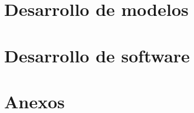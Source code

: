 \documentclass{article}
\begin{document}
\clearpage\hbox{}\thispagestyle{empty}\newpage
\clearpage\hbox{}\thispagestyle{empty}\newpage



\clearpage\hbox{}\thispagestyle{empty}\newpage



\clearpage\hbox{}\thispagestyle{empty}\newpage



\clearpage\hbox{}\thispagestyle{empty}\newpage



\clearpage\hbox{}\thispagestyle{empty}\newpage



\clearpage\hbox{}\thispagestyle{empty}\newpage
\clearpage\hbox{}\thispagestyle{empty}\newpage

\newpage
\tableofcontents

\newpage
\listoffigures

\newpage
\listoftables

\newpage



\newpage


\newpage


\newpage
\part{Desarrollo de modelos}

\newpage


\newpage


\newpage
\part{Desarrollo de software}

\newpage


\newpage


\newpage


\newpage


\newpage


\newpage
\part{Anexos}

\appendix

\newpage


\newpage


\newpage


\newpage

\end{document}
